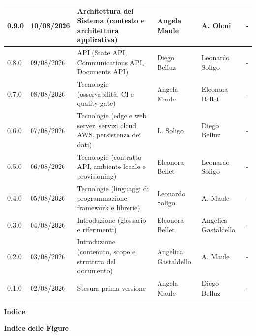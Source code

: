 \documentclass[a4paper,12pt]{article}
\begin{document}
\begin{center}
{\begin{longtable}{|p{1.4cm}|p{1.8cm}|p{5cm}|p{2.4cm}|p{2.3cm}|p{2.3cm}|}
        \hline
        0.9.0 & 10/08/2026 & Architettura del Sistema (contesto e architettura applicativa) & Angela Maule & A. Oloni & - \\
        \hline
        0.8.0 & 09/08/2026 & API (State API, Communications API, Documents API) & Diego Belluz & Leonardo Soligo & - \\
        \hline
        0.7.0 & 08/08/2026 & Tecnologie (osservabilità, CI e quality gate) & Angela Maule & Eleonora Bellet & - \\
        \hline
        0.6.0 & 07/08/2026 & Tecnologie (edge e web server, servizi cloud AWS, persistenza dei dati) & L. Soligo & Diego Belluz & - \\
        \hline
        0.5.0 & 06/08/2026 & Tecnologie (contratto API, ambiente locale e provisioning) & Eleonora Bellet & Leonardo Soligo & - \\
        \hline
        0.4.0 & 05/08/2026 & Tecnologie (linguaggi di programmazione, framework e librerie) & Leonardo Soligo & A. Maule & - \\
        \hline
        0.3.0 & 04/08/2026 & Introduzione (glossario e riferimenti) & Eleonora Bellet & Angelica Gastaldello & - \\
        \hline
        0.2.0 & 03/08/2026 & Introduzione (contenuto, scopo e struttura del documento) & Angelica Gastaldello & A. Maule & - \\
        \hline
        0.1.0 & 02/08/2026 & Stesura prima versione & Angela Maule & Diego Belluz & - \\
        \hline

    \end{longtable}
    }
\end{center}
\newpage

\begin{center}
    {\Large \textbf{Indice}}
\end{center}

\vspace{0.6cm}

\makeatletter
{}
\makeatother

\newpage

\begin{center}
    {\Large \textbf{Indice delle Figure}}
\end{center}

\vspace{0.6cm}

\makeatletter
{}
\makeatother

\newpage
\end{document}
